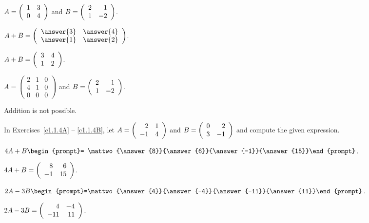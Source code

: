 \documentclass{ximera}
\begin{document}
\begin{exercise}\label{c1.1.3d}
  $A=\left(\begin{array}{rr} 1 & 3\\ 0 &4\end{array}\right)$ and $B=\left(\begin{array}{rr} 2 & 1\\ 1 &-2\end{array}\right)$.
  
  \begin{multipleChoice}
  \end{multipleChoice}
  \begin{exercise}
    $A + B = \mattwo{\answer{3}}{\answer{4}}{\answer{1}}{\answer{2}}$.

\begin{solution}
$A + B = \left(\begin{array}{rr} 3 & 4\\ 1 &2\end{array}\right)$.

\end{solution}
  \end{exercise}

\begin{solution}


\end{solution}
\end{exercise}

\begin{exercise}\label{c1.1.3e}
  $A=\left(\begin{array}{rrr} 2 & 1 & 0\\ 4 & 1 & 0\\
             0 & 0 & 0\end{array}\right)$ and $B=\left(\begin{array}{rr} 2 & 1\\ 1 &-2\end{array}\right)$.
         
         \begin{multipleChoice}
         \end{multipleChoice}         

\begin{solution}
Addition is not possible.

\end{solution}
\end{exercise}

\noindent In Exercises~\ref{c1.1.4A} -- \ref{c1.1.4B}, let
$A=\left(\begin{array}{rr} 2 & 1\\ -1 &4\end{array}\right)$ and $B=\left(\begin{array}{rr} 0 & 2\\ 3 &-1\end{array}\right)$ and compute the given 
expression.
\begin{exercise}\label{c1.1.4A}
  $4A+B\begin{prompt}= \mattwo{\answer{8}}{\answer{6}}{\answer{-1}}{\answer{15}}\end{prompt}$.

\begin{solution}
$4A + B = \left(\begin{array}{rr} 8 & 6\\ -1 &15\end{array}\right)$.


\end{solution}
\end{exercise}
\begin{exercise}\label{c1.1.4B}
  $2A-3B\begin{prompt}=\mattwo{\answer{4}}{\answer{-4}}{\answer{-11}}{\answer{11}}\end{prompt}$.

\begin{solution}
$2A - 3B = \left(\begin{array}{rr} 4 & -4\\ -11 &11\end{array}\right)$.




\end{solution}
\end{exercise}
\end{document}
